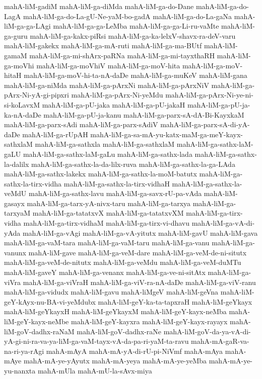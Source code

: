 {mahA-liM-gadiM
mahA-liM-ga-diMda
mahA-liM-ga-do-Dane
mahA-liM-ga-do-LagA
mahA-liM-ga-do-La-gU-Ne-yaM-bo-gadA
mahA-liM-ga-do-La-gaNa
mahA-liM-ga-ga-LAgi
mahA-liM-ga-ga-LeMba
mahA-liM-ga-ga-Li-ru-vaMte
mahA-liM-ga-guru
mahA-liM-ga-kakx-piRsi
mahA-liM-ga-ka-lelxV-shavx-ra-deV-varu
mahA-liM-gakekx
mahA-liM-ga-mA-ruti
mahA-liM-ga-ma-BUtf
mahA-liM-gamaM
mahA-liM-ga-mi-shArx-paRNa
mahA-liM-ga-mi-tayxthaRH
mahA-liM-ga-moVhi
mahA-liM-ga-moVhiV
mahA-liM-ga-moV-hita
mahA-liM-ga-moV-hitaH
mahA-liM-ga-moV-hi-ta-nA-daDe
mahA-liM-ga-muKeV
mahA-liM-gana
mahA-liM-ga-niMda
mahA-liM-ga-pArxNi
mahA-liM-ga-pArxNiV
mahA-liM-ga-pArx-Ni-yA-gi-pipxri
mahA-liM-ga-pArx-Ni-yeMdu
mahA-liM-ga-pArx-Ni-ye-ni-si-koLavxM
mahA-liM-ga-pU-jaka
mahA-liM-ga-pU-jakaH
mahA-liM-ga-pU-ja-ka-nA-daDe
mahA-liM-ga-pU-ja-kanu
mahA-liM-ga-parx-sA-dA-Bi-KayxkaM
mahA-liM-ga-parx-sAdi
mahA-liM-ga-parx-sAdiV
mahA-liM-ga-parx-sA-di-yA-daDe
mahA-liM-ga-rUpAH
mahA-liM-ga-sa-mA-yu-katx-maM-ga-meY-kayx-sathxlaM
mahA-liM-ga-sathxla
mahA-liM-ga-sathxlaM
mahA-liM-ga-sathx-laM-gaLU
mahA-liM-ga-sathx-laM-gaLu
mahA-liM-ga-sathx-lada
mahA-liM-ga-sathx-la-dalilx
mahA-liM-ga-sathx-la-da-lilx-ruva
mahA-liM-ga-sathx-la-ga-LAda
mahA-liM-ga-sathx-lakekx
mahA-liM-ga-sathx-la-moM-batutx
mahA-liM-ga-sathx-la-tirx-vidha
mahA-liM-ga-sathx-la-tirx-vidhaH
mahA-liM-ga-sathx-la-veMdU
mahA-liM-ga-sathx-lavu
mahA-liM-ga-savx-rU-pa-vAda
mahA-liM-gasayx
mahA-liM-ga-tarx-yA-nivx-taru
mahA-liM-ga-tarxya
mahA-liM-ga-tarxyaM
mahA-liM-ga-tatatxvX
mahA-liM-ga-tatatxvXM
mahA-liM-ga-tirx-vidha
mahA-liM-ga-tirx-vidhaM
mahA-liM-ga-tirx-vi-dhavu
mahA-liM-ga-vA-di-yAda
mahA-liM-ga-vAgi
mahA-liM-ga-vA-yitutx
mahA-liM-gavU
mahA-liM-gava
mahA-liM-ga-vaM-tara
mahA-liM-ga-vaM-taru
mahA-liM-ga-vanu
mahA-liM-ga-vanunx
mahA-liM-gave
mahA-liM-ga-veM-dare
mahA-liM-ga-veM-de-ni-situtx
mahA-liM-ga-veM-de-nitutx
mahA-liM-ga-veMdu
mahA-liM-ga-veM-duMTu
mahA-liM-gaveY
mahA-liM-ga-venanx
mahA-liM-ga-ve-ni-sitAtx
mahA-liM-ga-viVra
mahA-liM-ga-viVraH
mahA-liM-ga-viV-ra-nA-daDe
mahA-liM-ga-viV-ranu
mahA-liM-ga-vidudx
mahA-liM-gavu
mahA-liMgeV
mahA-liM-geVna
mahA-liM-geY-kAyx-nu-BA-vi-yeMdubx
mahA-liM-geY-ka-ta-tapxraH
mahA-liM-geYkayx
mahA-liM-geYkayxH
mahA-liM-geYkayxM
mahA-liM-geY-kayx-neMba
mahA-liM-geY-kayx-neMbe
mahA-liM-geY-kayxra
mahA-liM-geY-kayx-rayayx
mahA-liM-goV-dadhx-raNaM
mahA-liM-goV-dadhx-raNe
mahA-liM-goV-da-ya-vA-di-yA-gi-ni-ra-va-ya-liM-ga-vaM-tayx-vA-da-pa-ri-yaM-ta-ravu
mahA-mA-gaR-va-na-ri-ya-rAgi
mahA-mAyA
mahA-mA-yA-di-rU-pi-NiVmf
mahA-mAya
mahA-mAye
mahA-mA-ye-yAyutx
mahA-mA-yeya
mahA-mA-ye-yeMba
mahA-mA-ye-yu-nanxta
mahA-mUla
mahA-mU-la-sAvx-miya
}
